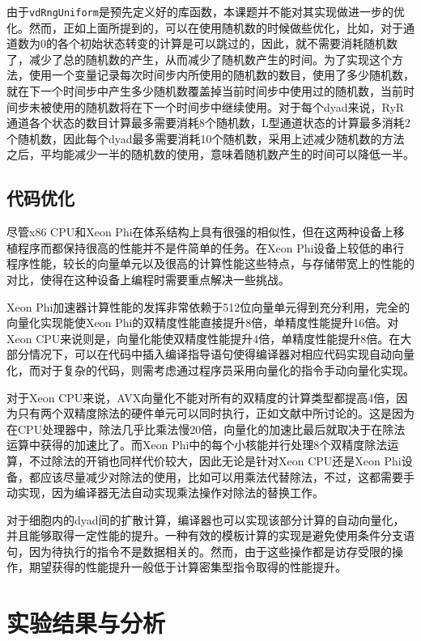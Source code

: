 由于\texttt{vdRngUniform}是预先定义好的库函数，本课题并不能对其实现做进一步的优化。然而，正如上面所提到的，可以在使用随机数的时候做些优化，比如，对于通道数为0的各个初始状态转变的计算是可以跳过的，因此，就不需要消耗随机数了，减少了总的随机数的产生，从而减少了随机数产生的时间。为了实现这个方法，使用一个变量记录每次时间步内所使用的随机数的数目，使用了多少随机数，就在下一个时间步中产生多少随机数覆盖掉当前时间步中使用过的随机数，当前时间步未被使用的随机数将在下一个时间步中继续使用。对于每个dyad来说，RyR通道各个状态的数目计算最多需要消耗8个随机数，L型通道状态的计算最多消耗2个随机数，因此每个dyad最多需要消耗10个随机数，采用上述减少随机数的方法之后，平均能减少一半的随机数的使用，意味着随机数产生的时间可以降低一半。

\subsection{代码优化}
尽管x86 CPU和Xeon Phi在体系结构上具有很强的相似性，但在这两种设备上移植程序而都保持很高的性能并不是件简单的任务。在Xeon Phi设备上较低的串行程序性能，较长的向量单元以及很高的计算性能这些特点，与存储带宽上的性能的对比，使得在这种设备上编程时需要重点解决一些挑战。

Xeon Phi加速器计算性能的发挥非常依赖于512位向量单元得到充分利用，完全的向量化实现能使Xeon Phi的双精度性能直接提升8倍，单精度性能提升16倍。对Xeon CPU来说则是，向量化能使双精度性能提升4倍，单精度性能提升8倍。在大部分情况下，可以在代码中插入编译指导语句使得编译器对相应代码实现自动向量化，而对于复杂的代码，则需考虑通过程序员采用向量化的指令手动向量化实现。

对于Xeon CPU来说，AVX向量化不能对所有的双精度的计算类型都提高4倍，因为只有两个双精度除法的硬件单元可以同时执行，正如文献中所讨论的。这是因为在CPU处理器中，除法几乎比乘法慢20倍，向量化的加速比最后就取决于在除法运算中获得的加速比了。而Xeon Phi中的每个小核能并行处理8个双精度除法运算，不过除法的开销也同样代价较大，因此无论是针对Xeon CPU还是Xeon Phi设备，都应该尽量减少对除法的使用，比如可以用乘法代替除法，不过，这都需要手动实现，因为编译器无法自动实现乘法操作对除法的替换工作。

对于细胞内的dyad间的扩散计算，编译器也可以实现该部分计算的自动向量化，并且能够取得一定性能的提升。一种有效的模板计算的实现是避免使用条件分支语句，因为待执行的指令不是数据相关的。然而，由于这些操作都是访存受限的操作，期望获得的性能提升一般低于计算密集型指令取得的性能提升。

\section{实验结果与分析}
